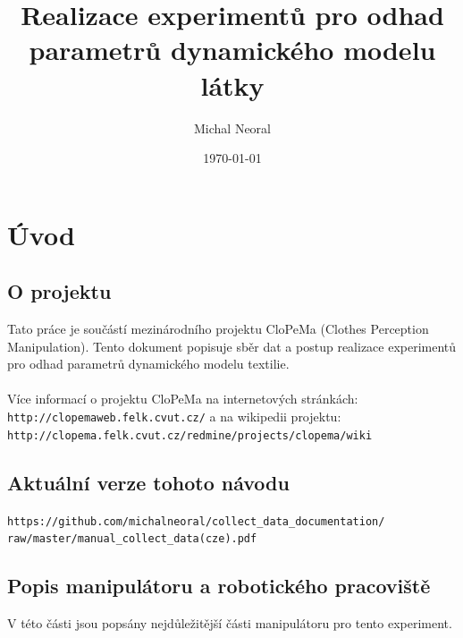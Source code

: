 \documentclass[10pt,a4paper,titlepage,oneside]{report}
\begin{document}
\title{Realizace experimentů pro odhad parametrů dynamického modelu látky}
\author{Michal Neoral}
\date{\today{}}
\maketitle



\chapter{Úvod}
\label{chap:intro}



\section{O projektu}
\label{sec:about}
Tato práce je součástí mezinárodního projektu CloPeMa (Clothes Perception Manipulation). Tento dokument popisuje sběr dat a postup realizace experimentů pro odhad parametrů dynamického modelu textilie.\\
\\
Více informací o projektu CloPeMa na internetových stránkách: \verb|http://clopemaweb.felk.cvut.cz/| a na wikipedii projektu: \verb|http://clopema.felk.cvut.cz/redmine/projects/clopema/wiki|
\\



\section{Aktuální verze tohoto návodu}
\verb|https://github.com/michalneoral/collect_data_documentation/|\\
\verb|raw/master/manual_collect_data(cze).pdf|\\




\section{Popis manipulátoru a robotického pracoviště}
\label{sec:desription}

V této části jsou popsány nejdůležitější části manipulátoru pro tento experiment.
\end{document}
